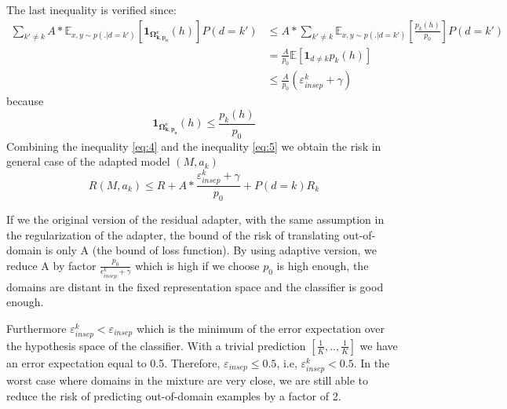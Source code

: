 \documentclass[12pt,a4paper,twoside]{report}
\theoremstyle{definition}
\newcommand{\fyTodo}[1]{\Todo[FY:]{\textcolor{orange}{#1}}}
\begin{document}
The last inequality is verified since:
\begin{equation}
\begin{split}
\displaystyle{\mathop{\sum}_{k' \neq k}} A * \mathbb{E}_{x,y \sim p(.|d=k')} [\mathbf{1}_{\mathbf{\Omega_{k,p_{0}}^{c}}} (h)]P(d=k') &\leq A * \displaystyle{\mathop{\sum}_{k' \neq k}} \mathbb{E}_{x,y \sim p(.|d=k') } [\frac{p_k(h)}{p_0}]P(d=k') \\
		& = \frac{A}{p_0} \mathbb{E}[\mathbf{1}_{d\neq k}p_k(h)] \\
		& \leq \frac{A}{p_0} (\mathbb{\varepsilon}_{insep}^k + \gamma)
\end{split}
\end{equation}
because
$$ \mathbf{1}_{\mathbf{\Omega_{k,p_{0}}^{c}}}(h) \leq \frac{p_k(h)}{p_0} $$
Combining the inequality \ref{eq:4} and the inequality \ref{eq:5} we obtain the risk in general case of the adapted model $(M,a_k)$ $$R(M,a_k) \leq R + A * \frac{\mathbb{\varepsilon}_{insep}^k + \gamma}{p_0} + P(d=k)R_k$$

If we the original version of the residual adapter, with the same assumption in the regularization of the adapter, the bound of the risk of translating out-of-domain is only A (the bound of loss function). By using adaptive version, we reduce A by factor $\frac{p_0}{\epsilon^k_{insep}+\gamma}$ which is high if we choose $p_0$ is high enough, the domains are distant in the fixed representation space and the classifier is good enough. 

Furthermore $ \varepsilon^k_{insep} < \varepsilon_{insep} $ which is the minimum of the error expectation over the hypothesis space of the classifier. With a trivial prediction $[\frac{1}{K},..,\frac{1}{K}]$ we have an error expectation equal to 0.5. Therefore, $\varepsilon_{insep} \leq 0.5$, i.e, $\varepsilon^k_{insep} < 0.5$. In the worst case where domains in the mixture are very close, we are still able to reduce the risk of predicting out-of-domain examples by a factor of 2.
\fyTodo{I sort of buy the equations but then so what ? We should may be compare with non-adaptive ?}
\end{document}
